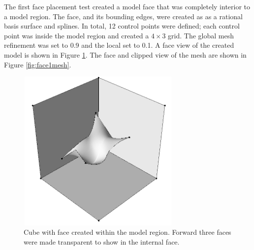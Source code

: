 \documentclass[a4paper, 12pt]{article}
\begin{document}
The first face placement test created a model face that was 
completely interior
to a model region.
The face, and its bounding edges,  were created as 
as a rational basis surface and splines. In total, 12 control points were 
defined; each control point was inside the model region 
and created a $4\times3$
grid. The global mesh refinement was set to 0.9 and the local set to 0.1. 
A face view of the created model is shown in Figure \ref{fig:face1model}.
The face and clipped view of the mesh are 
shown in Figure \ref{fig:face1mesh}.

\begin{figure}[H]
  \centering
  \includegraphics[width=8cm, height=8cm]{test10_smd_seeThrough}
  \caption{Cube with face created within the model region. 
        Forward three faces
        were made transparent to show in the internal face.}
  \label{fig:face1model}
\end{figure}
\end{document}
